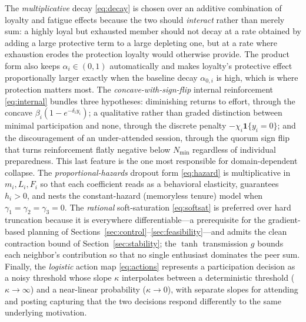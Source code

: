 \documentclass[11pt]{article}
\begin{document}
The \emph{multiplicative} decay \eqref{eq:decay} is chosen over an additive combination of loyalty and fatigue effects because the two should \emph{interact} rather than merely sum: a highly loyal but exhausted member should not decay at a rate obtained by adding a large protective term to a large depleting one, but at a rate where exhaustion erodes the protection loyalty would otherwise provide. The product form also keeps $\alpha_i\in(0,1)$ automatically and makes loyalty's protective effect proportionally larger exactly when the baseline decay $\alpha_{0,i}$ is high, which is where protection matters most. The \emph{concave-with-sign-flip} internal reinforcement \eqref{eq:internal} bundles three hypotheses: diminishing returns to effort, through the concave $\beta_i(1-e^{-\delta_i y_i})$; a qualitative rather than graded distinction between minimal participation and none, through the discrete penalty $-\chi_i\mathbf 1\{y_i=0\}$; and the discouragement of an under-attended session, through the quorum sign flip that turns reinforcement flatly negative below $N_{\min}$ regardless of individual preparedness. This last feature is the one most responsible for domain-dependent collapse. The \emph{proportional-hazards} dropout form \eqref{eq:hazard} is multiplicative in $m_i,L_i,F_i$ so that each coefficient reads as a behavioral elasticity, guarantees $h_i>0$, and nests the constant-hazard (memoryless tenure) model when $\gamma_1=\gamma_2=\gamma_3=0$. The \emph{rational} soft-saturation \eqref{eq:softsat} is preferred over hard truncation because it is everywhere differentiable---a prerequisite for the gradient-based planning of Sections~\ref{sec:control}--\ref{sec:feasibility}---and admits the clean contraction bound of Section~\ref{sec:stability}; the $\tanh$ transmission $g$ bounds each neighbor's contribution so that no single enthusiast dominates the peer sum. Finally, the \emph{logistic} action map \eqref{eq:actions} represents a participation decision as a noisy threshold whose slope $\kappa$ interpolates between a deterministic threshold ($\kappa\to\infty$) and a near-linear probability ($\kappa\to0$), with separate slopes for attending and posting capturing that the two decisions respond differently to the same underlying motivation.
\end{document}
